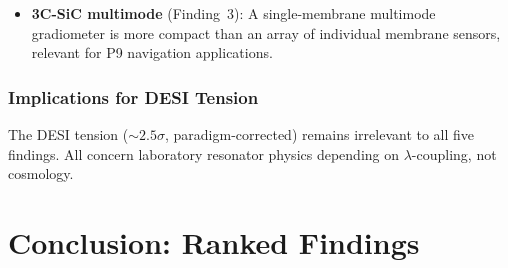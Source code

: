 \documentclass[11pt]{article}
\theoremstyle{definition}
\theoremstyle{remark}
\begin{document}
\begin{itemize}[nosep]
\item \textbf{3C-SiC multimode} (Finding~3): A single-membrane
  multimode gradiometer is more compact than an array of
  individual membrane sensors, relevant for P9 navigation
  applications.
\end{itemize}

\section{Implications for DESI Tension}

The DESI tension ($\sim 2.5\sigma$, paradigm-corrected) remains
irrelevant to all five findings. All concern laboratory resonator
physics depending on $\lambda$-coupling, not cosmology.


\part{Conclusion: Ranked Findings}
\label{part:conclusion}
\end{document}

